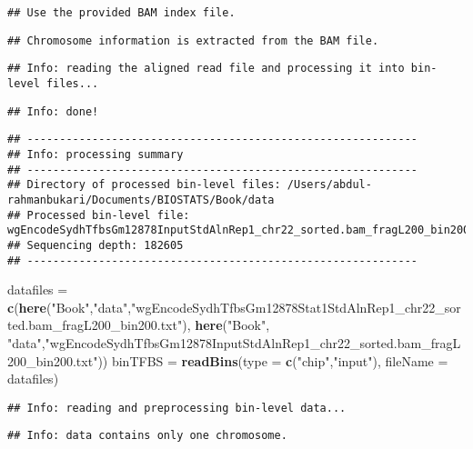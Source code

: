 \documentclass[]{article}
\newenvironment{Shaded}{\begin{snugshade}}{\end{snugshade}}
\newcommand{\DataTypeTok}[1]{\textcolor[rgb]{0.13,0.29,0.53}{#1}}
\newcommand{\KeywordTok}[1]{\textcolor[rgb]{0.13,0.29,0.53}{\textbf{#1}}}
\newcommand{\NormalTok}[1]{#1}
\newcommand{\StringTok}[1]{\textcolor[rgb]{0.31,0.60,0.02}{#1}}
\begin{document}
\begin{verbatim}
## Use the provided BAM index file.
\end{verbatim}

\begin{verbatim}
## Chromosome information is extracted from the BAM file.
\end{verbatim}

\begin{verbatim}
## Info: reading the aligned read file and processing it into bin-level files...
\end{verbatim}

\begin{verbatim}
## Info: done!
\end{verbatim}

\begin{verbatim}
## ------------------------------------------------------------
## Info: processing summary
## ------------------------------------------------------------
## Directory of processed bin-level files: /Users/abdul-rahmanbukari/Documents/BIOSTATS/Book/data 
## Processed bin-level file: wgEncodeSydhTfbsGm12878InputStdAlnRep1_chr22_sorted.bam_fragL200_bin200.txt
## Sequencing depth: 182605 
## ------------------------------------------------------------
\end{verbatim}

\begin{Shaded}
\begin{Highlighting}[]
\NormalTok{datafiles =}\StringTok{ }\KeywordTok{c}\NormalTok{(}\KeywordTok{here}\NormalTok{(}\StringTok{"Book"}\NormalTok{,}\StringTok{"data"}\NormalTok{,}\StringTok{"wgEncodeSydhTfbsGm12878Stat1StdAlnRep1_chr22_sorted.bam_fragL200_bin200.txt"}\NormalTok{), }\KeywordTok{here}\NormalTok{(}\StringTok{"Book"}\NormalTok{, }\StringTok{"data"}\NormalTok{,}\StringTok{"wgEncodeSydhTfbsGm12878InputStdAlnRep1_chr22_sorted.bam_fragL200_bin200.txt"}\NormalTok{))}
\NormalTok{binTFBS =}\StringTok{ }\KeywordTok{readBins}\NormalTok{(}\DataTypeTok{type =} \KeywordTok{c}\NormalTok{(}\StringTok{"chip"}\NormalTok{,}\StringTok{"input"}\NormalTok{), }\DataTypeTok{fileName =}\NormalTok{ datafiles)}
\end{Highlighting}
\end{Shaded}

\begin{verbatim}
## Info: reading and preprocessing bin-level data...
\end{verbatim}

\begin{verbatim}
## Info: data contains only one chromosome.
\end{verbatim}
\end{document}

